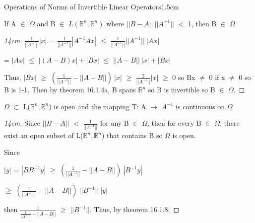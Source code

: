     \begin{ltheorem}{Operations of Norms of Invertible Linear Operators}{1.5cm}
        \item If A $\in$ $\Omega$ and B $\in$ $L(\mathbb{R}^n,\mathbb{R}^n)$
            where $||B-A|| \ ||A^{-1}||$ $<$ 1, then B $\in$ $\Omega$

            \begin{proof}[14cm]
                $\frac{1}{||A^{-1}||} |x|$
                = $\frac{1}{||A^{-1}||} |A^{-1}Ax|$
                $\leq$ $\frac{1}{||A^{-1}||} ||A^{-1}|| \ |Ax|$

                \hspace{1.4cm}
                = $|Ax|$
                $\leq$ $|(A-B)x| + |Bx|$
                $\leq$ $||A-B|| \ |x| + |Bx|$

                Thus,
                $|Bx|$
                $\geq$ $(\frac{1}{||A^{-1}||} - ||A-B||) \ |x|$
                $\geq$ $\frac{2}{||A^{-1}||} |x|$ $\geq$ 0
                so Bx $\not =$ 0 if x $\not =$ 0
                so B is 1-1.
                Then by {\color{red} theorem 16.1.4a}, B spans $\mathbb{R}^n$
                so B is invertible so B $\in$ $\Omega$. 
            \end{proof}

        \item $\Omega$ $\subset$ L($\mathbb{R}^n,\mathbb{R}^n$) is open
            and the mapping T: A $\rightarrow$ $A^{-1}$ is continuous on $\Omega$

            \begin{proof}[14cm]
                Since $||B-A||$ $<$ $\frac{1}{||A^{-1}||}$ for any B $\in$ $\Omega$,
                then for every B $\in$ $\Omega$, there exist an open subset
                of L($\mathbb{R}^n,\mathbb{R}^n$) that contains B
                so $\Omega$ is open.
                
                Since

                \hspace{0.5cm}
                $|y|$ = $|BB^{-1}y|$
                $\geq$ $(\frac{1}{||A^{-1}||} - ||A-B||) \ |B^{-1}y|$
                
                \hspace{1.1cm}
                $\geq$ $(\frac{1}{||A^{-1}||} - ||A-B||) \ ||B^{-1}|| \ |y|$

                then $\frac{1}{\frac{1}{||A^{-1}||} - ||A-B||}$ $\geq$ $||B^{-1}||$.
                Thus, by {\color{red} theorem 16.1.8}:


\end{proof}
\end{ltheorem}
